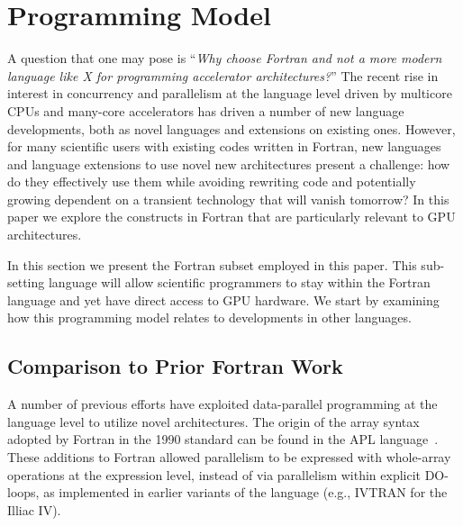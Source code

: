 \section{Programming Model}

A question that one may pose is ``\emph{Why choose Fortran and not a more modern
  language like X for programming accelerator architectures?}''  The recent rise
in interest in concurrency and parallelism at the language level driven by
multicore CPUs and many-core accelerators has driven a number of new language
developments, both as novel languages and extensions on existing ones.  However,
for many scientific users with existing codes written in Fortran, new languages
and language extensions to use novel new architectures present a challenge: how
do they effectively use them while avoiding rewriting code and potentially
growing dependent on a transient technology that will vanish tomorrow?
In this paper we explore the constructs in Fortran that are particularly
relevant to GPU architectures.

In this section we present the Fortran subset employed in this paper.  This
sub-setting language will allow scientific programmers to stay within the Fortran
language and yet have direct access to GPU hardware.  We start by examining how this
programming model relates to developments in other languages.


\subsection{Comparison to Prior Fortran Work}

A number of previous efforts have exploited data-parallel programming at the
language level to utilize novel architectures.
The origin of the array syntax adopted by Fortran in the 1990
standard can be found in the APL language~\cite{iverson79apl}.  These additions
to Fortran allowed parallelism to be expressed with whole-array operations at
the expression level, instead of via parallelism within explicit DO-loops, as
implemented in earlier variants of the language (e.g.,
IVTRAN for the Illiac IV).

